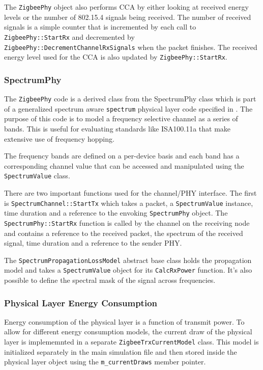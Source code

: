 \documentclass[12pt,letterpaper]{article}
\begin{document}
The {\tt ZigbeePhy} object also performs CCA by either looking at received energy levels or the number of 802.15.4 signals being received.  The number of received signals is a simple counter that is incremented by each call to {\tt ZigbeePhy::StartRx} and decremented by {\tt ZigbeePhy::DecrementChannelRxSignals} when the packet finishes.  The received energy level used for the CCA is also updated by {\tt ZigbeePhy::StartRx}.



\subsubsection{SpectrumPhy}

The {\tt ZigbeePhy} code is a derived class from the SpectrumPhy class which is part of a generalized spectrum aware {\tt spectrum} physical layer code specified in \cite{baldo_n1}.  The purpose of this code is to model a frequency selective channel as a series of bands.  This is useful for evaluating standards like ISA100.11a that make extensive use of frequency hopping.

The frequency bands are defined on a per-device basis and each band has a corresponding channel value that can be accessed and manipulated using the {\tt SpectrumValue} class.

There are two important functions used for the channel/PHY interface.  The first is {\tt SpectrumChannel::StartTx} which takes a packet, a {\tt SpectrumValue} instance, time duration and a reference to the envoking {\tt SpectrumPhy} object.  The {\tt SpectrumPhy::StartRx} function is called by the channel on the receiving node and contains a reference to the received packet, the spectrum of the received signal, time duration and a reference to the sender PHY.

The {\tt SpectrumPropagationLossModel} abstract base class holds the propagation model and takes a {\tt SpectrumValue} object for its {\tt CalcRxPower} function.  It's also possible to define the spectral mask of the signal across frequencies.


\subsubsection{Physical Layer Energy Consumption}

Energy consumption of the physical layer is a function of transmit power.  To allow for different energy consumption models, the current draw of the physical layer is implememnted in a separate {\tt ZigbeeTrxCurrentModel} class.  This model is initialized separately in the main simulation file and then stored inside the physical layer object using the {\tt m\_currentDraws} member pointer.





\end{document}
